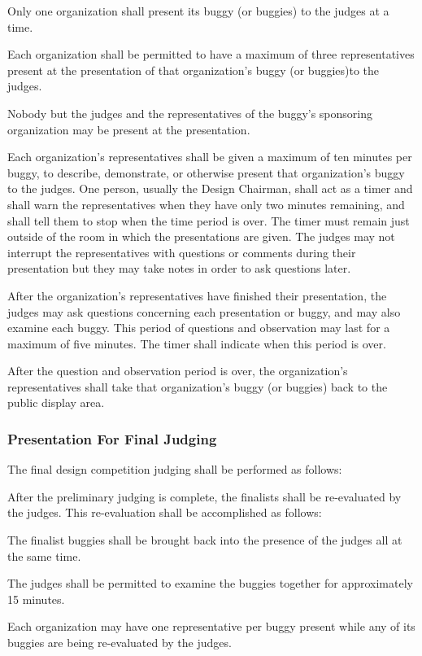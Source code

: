 \documentclass[openany]{book}
\begin{document}
Only one organization shall present its buggy (or buggies) to the judges at a time.

Each organization shall be permitted to have a maximum of three representatives present at the presentation of that organization's buggy (or buggies)to the judges.

Nobody but the judges and the representatives of the buggy's sponsoring organization may be present at the presentation.

Each organization's representatives shall be given a maximum of ten minutes per buggy, to describe, demonstrate, or otherwise present that organization's buggy to the judges. One person, usually the Design Chairman, shall act as a timer and shall warn the representatives when they have only two minutes remaining, and shall tell them to stop when the time period is over. The timer must remain just outside of the room in which the presentations are given. The judges may not interrupt the representatives with questions or comments during their presentation but they may take notes in order to ask questions later.

After the organization's representatives have finished their presentation, the judges may ask questions concerning each presentation or buggy, and may also examine each buggy. This period of questions and observation may last for a maximum of five minutes. The timer shall indicate when this period is over.

After the question and observation period is over, the organization's representatives shall take that organization's buggy (or buggies) back to the public display area.

\subsubsection{Presentation For Final Judging}

The final design competition judging shall be performed as follows:

After the preliminary judging is complete, the finalists shall be re-evaluated by the judges. This re-evaluation shall be accomplished as follows:

The finalist buggies shall be brought back into the presence of the judges all at the same time.

The judges shall be permitted to examine the buggies together for approximately 15 minutes.

Each organization may have one representative per buggy present while any of its buggies are being re-evaluated by the judges.
\end{document}
